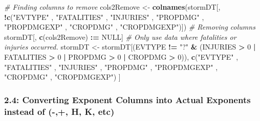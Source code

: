 \documentclass[
]{article}
\newenvironment{Shaded}{\begin{snugshade}}{\end{snugshade}}
\newcommand{\CommentTok}[1]{\textcolor[rgb]{0.56,0.35,0.01}{\textit{#1}}}
\newcommand{\DecValTok}[1]{\textcolor[rgb]{0.00,0.00,0.81}{#1}}
\newcommand{\ErrorTok}[1]{\textcolor[rgb]{0.64,0.00,0.00}{\textbf{#1}}}
\newcommand{\KeywordTok}[1]{\textcolor[rgb]{0.13,0.29,0.53}{\textbf{#1}}}
\newcommand{\NormalTok}[1]{#1}
\newcommand{\OperatorTok}[1]{\textcolor[rgb]{0.81,0.36,0.00}{\textbf{#1}}}
\newcommand{\OtherTok}[1]{\textcolor[rgb]{0.56,0.35,0.01}{#1}}
\newcommand{\StringTok}[1]{\textcolor[rgb]{0.31,0.60,0.02}{#1}}
\begin{document}
\begin{Shaded}
\begin{Highlighting}[]
\CommentTok{# Finding columns to remove}
\NormalTok{cols2Remove <-}\StringTok{ }\KeywordTok{colnames}\NormalTok{(stormDT[, }\OperatorTok{!}\KeywordTok{c}\NormalTok{(}\StringTok{"EVTYPE"}
\NormalTok{  , }\StringTok{"FATALITIES"}
\NormalTok{  , }\StringTok{"INJURIES"}
\NormalTok{  , }\StringTok{"PROPDMG"}
\NormalTok{  , }\StringTok{"PROPDMGEXP"}
\NormalTok{  , }\StringTok{"CROPDMG"}
\NormalTok{  , }\StringTok{"CROPDMGEXP"}\NormalTok{)])}
\CommentTok{# Removing columns}
\NormalTok{stormDT[, }\KeywordTok{c}\NormalTok{(cols2Remove) }\OperatorTok{:}\ErrorTok{=}\StringTok{ }\OtherTok{NULL}\NormalTok{]}
\CommentTok{# Only use data where fatalities or injuries occurred.  }
\NormalTok{stormDT <-}\StringTok{ }\NormalTok{stormDT[(EVTYPE }\OperatorTok{!=}\StringTok{ "?"} \OperatorTok{&}\StringTok{ }
\StringTok{             }\NormalTok{(INJURIES }\OperatorTok{>}\StringTok{ }\DecValTok{0} \OperatorTok{|}\StringTok{ }\NormalTok{FATALITIES }\OperatorTok{>}\StringTok{ }\DecValTok{0} \OperatorTok{|}\StringTok{ }\NormalTok{PROPDMG }\OperatorTok{>}\StringTok{ }\DecValTok{0} \OperatorTok{|}\StringTok{ }\NormalTok{CROPDMG }\OperatorTok{>}\StringTok{ }\DecValTok{0}\NormalTok{)), }\KeywordTok{c}\NormalTok{(}\StringTok{"EVTYPE"}
\NormalTok{                                                                            , }\StringTok{"FATALITIES"}
\NormalTok{                                                                            , }\StringTok{"INJURIES"}
\NormalTok{                                                                            , }\StringTok{"PROPDMG"}
\NormalTok{                                                                            , }\StringTok{"PROPDMGEXP"}
\NormalTok{                                                                            , }\StringTok{"CROPDMG"}
\NormalTok{                                                                            , }\StringTok{"CROPDMGEXP"}\NormalTok{) ]}
\end{Highlighting}
\end{Shaded}

\hypertarget{converting-exponent-columns-into-actual-exponents-instead-of---h-k-etc}{%
\subsubsection{2.4: Converting Exponent Columns into Actual Exponents
instead of (-,+, H, K,
etc)}\label{converting-exponent-columns-into-actual-exponents-instead-of---h-k-etc}}
\end{document}
